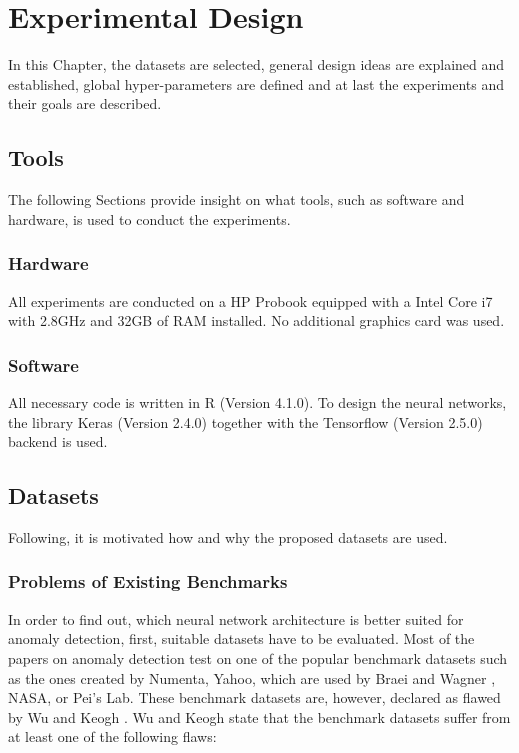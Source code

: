 \chapter{Experimental Design} \label{ExpDesign}
In this Chapter, the datasets are selected, general design ideas are explained and established, global hyper-parameters are defined and at last the experiments and their goals are described.

\section{Tools}
The following Sections provide insight on what tools, such as software and hardware, is used to conduct the experiments.

\subsection{Hardware}
All experiments are conducted on a HP Probook equipped with a Intel Core i7 with 2.8GHz and 32GB of RAM installed. No additional graphics card was used.

\subsection{Software}
All necessary code is written in R (Version 4.1.0). To design the neural networks, the library Keras (Version 2.4.0) together with the Tensorflow (Version 2.5.0) backend is used.


\section{Datasets} \label{Datasets}
Following, it is motivated how and why the proposed datasets are used.

\subsection{Problems of Existing Benchmarks} \label{Problems of Existing Benchmarks}
In order to find out, which neural network architecture is better suited for anomaly detection, first, suitable datasets have to be evaluated. Most of the papers on anomaly detection test on one of the popular benchmark datasets such as the ones created by Numenta, Yahoo,  which are used by Braei and Wagner \parencite{Braei2020}, NASA, or Pei's Lab. These benchmark datasets are, however, declared as flawed by Wu and Keogh \parencite*{Wu2020}. Wu and Keogh \parencite*{Wu2020} state that the benchmark datasets suffer from at least one of the following flaws:

